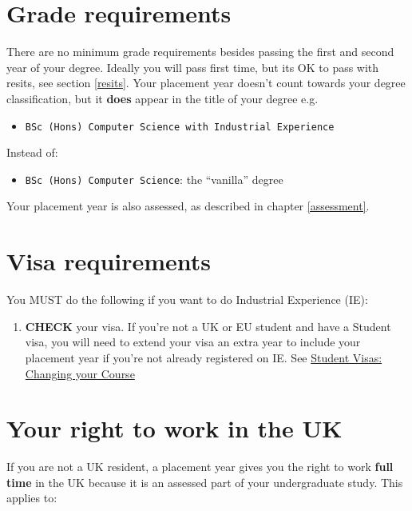 \documentclass[
]{book}
\providecommand{\tightlist}{%
  \setlength{\itemsep}{0pt}\setlength{\parskip}{0pt}}
\begin{document}
\section{Grade requirements}\label{grade-requirements}

There are no minimum grade requirements besides passing the first and second year of your degree. Ideally you will pass first time, but its OK to pass with resits, see section \ref{resits}. Your placement year doesn't count towards your degree classification, but it \textbf{does} appear in the title of your degree e.g.

\begin{itemize}
\tightlist
\item
  \texttt{BSc\ (Hons)\ Computer\ Science\ with\ Industrial\ Experience}
\end{itemize}

Instead of:

\begin{itemize}
\tightlist
\item
  \texttt{BSc\ (Hons)\ Computer\ Science}: the ``vanilla'' degree
\end{itemize}

Your placement year is also assessed, as described in chapter \ref{assessment}.

\section{Visa requirements}\label{visa-requirements}

You MUST do the following if you want to do Industrial Experience (IE):

\begin{enumerate}
\def\labelenumi{\arabic{enumi}.}
\tightlist
\item
  \textbf{CHECK} your visa. If you're not a UK or EU student and have a Student visa, you will need to extend your visa an extra year to include your placement year if you're not already registered on IE. See \href{documents.manchester.ac.uk/display.aspx?DocID=37044}{Student Visas: Changing your Course} \citep{changing}
\end{enumerate}

\section{Your right to work in the UK}\label{uk}

If you are not a UK resident, a placement year gives you the right to work \textbf{full time} in the UK because it is an assessed part of your undergraduate study. \citep{righttowork, workingduringstudy} This applies to:
\end{document}
